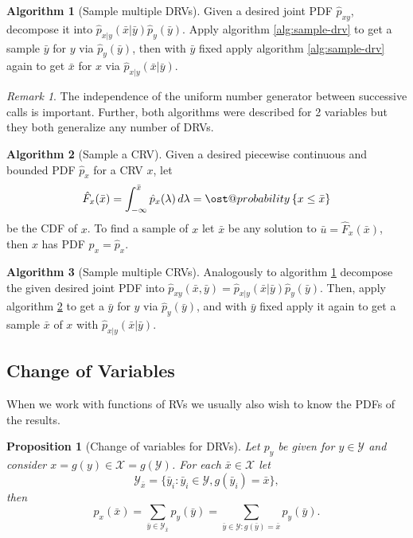 \documentclass[]{hsrzf}
\makeatletter
\renewcommand*{\Pr}[2][]{\ost@probability_{#1}\left\{#2\right\}}
\theoremstyle{plain}
\newtheorem{prop}{Proposition}[section]
\theoremstyle{definition}
\newtheorem{alg}{Algorithm}[section]
\theoremstyle{remark}
\newtheorem*{remark}{Remark}
\makeatother
\begin{document}
\begin{alg}[Sample multiple DRVs] \label{alg:sample-multiple-drvs}
  Given a desired joint PDF $\hat{p}_{xy}$, decompose it into
  $\hat{p}_{x|y}(\bar{x}|\bar{y}) \hat{p}_y(\bar{y})$. Apply algorithm
  \ref{alg:sample-drv} to get a sample $\bar{y}$ for $y$ via
  $\hat{p}_y(\bar{y})$, then with $\bar{y}$ fixed apply algorithm
  \ref{alg:sample-drv} again to get $\bar{x}$ for $x$ via
  $\hat{p}_{x|y}(\bar{x}|\bar{y})$.
\end{alg}

\begin{remark}
  The independence of the uniform number generator between successive calls is
  important. Further, both algorithms were described for 2 variables but they
  both generalize any number of DRVs.
\end{remark}

\begin{alg}[Sample a CRV] \label{alg:sample-crv}
  Given a desired piecewise continuous and bounded PDF $\hat{p}_x$ for a CRV
  $x$, let
  \[
    \hat{F}_x(\bar{x})
      = \int_{-\infty}^{\bar{x}} \hat{p}_x(\lambda) \, d\lambda
      = \Pr{x \leq \bar{x}}
  \]
  be the CDF of $x$. To find a sample of $x$ let $\bar{x}$ be any solution to
  $\bar{u} = \hat{F}_x(\bar{x})$, then $x$ has PDF $p_x = \hat{p}_x$.
\end{alg}

\begin{alg}[Sample multiple CRVs]
  Analogously to algorithm \ref{alg:sample-multiple-drvs} decompose the
  given desired joint PDF into $\hat{p}_{xy}(\bar{x},\bar{y}) =
  \hat{p}_{x|y}(\bar{x}|\bar{y}) \hat{p}_y(\bar{y})$. Then, apply algorithm
  \ref{alg:sample-crv} to get a $\bar{y}$ for $y$ via $\hat{p}_y(\bar{y})$,
  and with $\bar{y}$ fixed apply it again to get a sample $\bar{x}$ of $x$
  with $\hat{p}_{x|y}(\bar{x}|\bar{y})$.
\end{alg}

\subsection{Change of Variables}

When we work with functions of RVs we usually also wish to know the
PDFs of the results.

\begin{prop}[Change of variables for DRVs]
  Let $p_y$ be given for $y \in \mathcal{Y}$ and consider $x = g(y) \in
  \mathcal{X} = g(\mathcal{Y})$. For each $\bar{x} \in \mathcal{X}$ let
  \[
    \mathcal{Y}_{\bar{x}} = \{ \bar{y}_i : \bar{y}_i \in \mathcal{Y},
    g(\bar{y}_i) = \bar{x} \},
  \]
  then
  \[
    p_x(\bar{x}) = 
      \sum_{\bar{y} \in \mathcal{Y}_{\bar{x}}} p_y(\bar{y}) =
      \sum_{\bar{y} \in \mathcal{Y} : g(\bar{y}) = \bar{x}}
        p_y(\bar{y}).
  \]
\end{prop}
\end{document}
